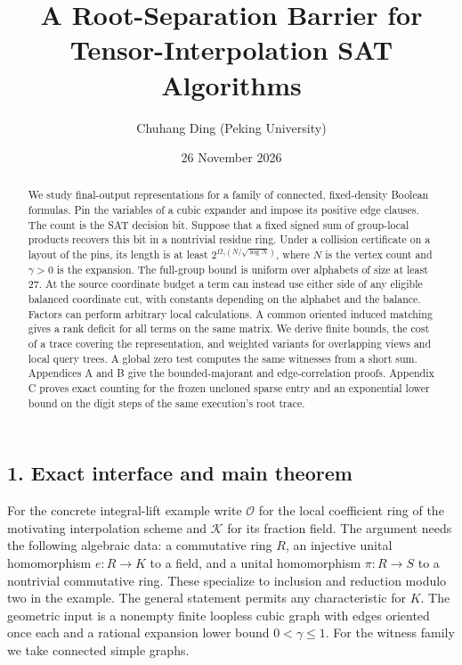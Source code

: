 \documentclass[
  11pt,
]{article}
\title{A Root-Separation Barrier for Tensor-Interpolation SAT
Algorithms}
\author{Chuhang Ding (Peking University)}
\date{26 November 2026}
\begin{document}
\maketitle


\begin{abstract}
We study final-output representations for a family of connected, fixed-density
Boolean formulas. Pin the variables of a cubic expander and impose its positive
edge clauses. The count is the SAT decision bit. Suppose that a fixed signed
sum of group-local products recovers this bit in a nontrivial residue ring.
Under a collision certificate on a layout of the pins, its length is at least
\(2^{\Omega_\gamma(N/\sqrt{\log N})}\), where \(N\) is the vertex count and
\(\gamma>0\) is the expansion. The full-group bound is uniform over alphabets
of size at least 27. At the source coordinate budget a term can instead use
either side of any eligible balanced coordinate cut, with constants depending
on the alphabet and the balance. Factors can perform arbitrary local
calculations. A common oriented induced matching gives a rank deficit for
all terms on the same matrix. We derive finite bounds, the cost of a trace
covering the representation, and weighted variants for overlapping views and
local query trees. A global zero test computes the same witnesses from a short
sum. Appendices A and B give the bounded-majorant and edge-correlation
proofs. Appendix C proves exact counting for the frozen uncloned sparse
entry and an exponential lower bound on the digit steps of the same
execution's root trace.
\end{abstract}

\subsection{1. Exact interface and main
theorem}\label{exact-interface-and-main-theorem}

For the concrete integral-lift example write \(\mathcal O\) for the
local coefficient ring of the motivating interpolation scheme and \(\mathcal K\)
for its fraction field. The argument needs the following algebraic data:
a commutative ring \(R\), an injective unital homomorphism \(e:R\to K\) to
a field, and a unital homomorphism \(\pi:R\to S\) to a nontrivial
commutative ring. These specialize to inclusion and reduction modulo two in
the example. The general statement permits any characteristic for \(K\).
The geometric input is a nonempty finite loopless cubic graph with edges oriented once each
and a rational expansion lower bound \(0<\gamma\le1\). For the witness
family we take connected simple graphs.
\end{document}
